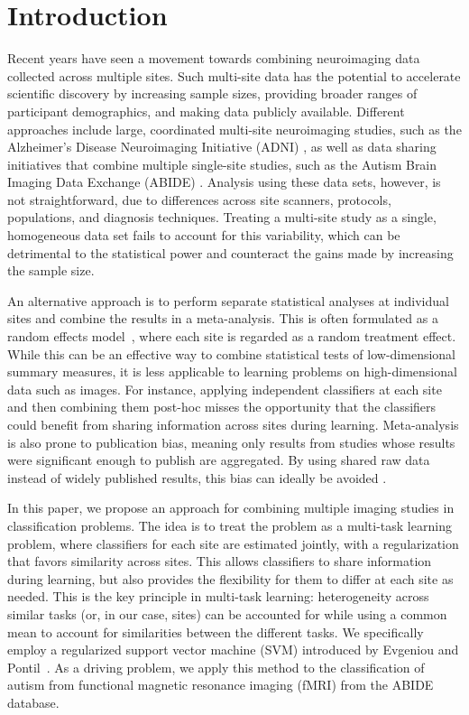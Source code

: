\documentclass{llncs}
\begin{document}
\section{Introduction}
Recent years have seen a movement towards combining neuroimaging data collected
across multiple sites. Such multi-site data has the potential to accelerate
scientific discovery by increasing sample sizes, providing broader ranges of
participant demographics, and making data publicly available. Different
approaches include large, coordinated multi-site neuroimaging studies, such as
the Alzheimer's Disease Neuroimaging Initiative (ADNI) \cite{adni}, as well as
data sharing initiatives that combine multiple single-site studies, such as the
Autism Brain Imaging Data Exchange (ABIDE) \cite{abide}. Analysis using these
data sets, however, is not straightforward, due to differences across site
scanners, protocols, populations, and diagnosis techniques. Treating a
multi-site study as a single, homogeneous data set fails to account for this
variability, which can be detrimental to the statistical power and counteract
the gains made by increasing the sample size.

An alternative approach is to perform separate statistical analyses at
individual sites and combine the results in a meta-analysis. This is often
formulated as a random effects model~\cite{DerSimonian}, where each site is
regarded as a random treatment effect. While this can be an effective way to
combine statistical tests of low-dimensional summary measures, it is less
applicable to learning problems on high-dimensional data such as images. For
instance, applying independent classifiers at each site and then combining them
post-hoc misses the opportunity that the classifiers could benefit from sharing
information across sites during learning.  Meta-analysis is also prone to publication bias, meaning only results from
studies whose results were significant enough to publish are aggregated.  By using shared raw data instead of widely
published results, this bias can ideally be avoided \cite{meta}.

In this paper, we propose an approach for combining multiple imaging studies in
classification problems. The idea is to treat the problem as a multi-task
learning problem, where classifiers for each site are estimated jointly, with a
regularization that favors similarity across sites. This allows classifiers to
share information during learning, but also provides the flexibility for them to
differ at each site as needed. This is the key principle in multi-task learning:
heterogeneity across similar tasks (or, in our case, sites) can be accounted for
while using a common mean to account for similarities between the different
tasks. We specifically employ a regularized support vector machine (SVM)
introduced by Evgeniou and Pontil~\cite{regMTL}. As a driving problem, we
apply this method to the classification of autism from functional magnetic
resonance imaging (fMRI) from the ABIDE database.
\end{document}

